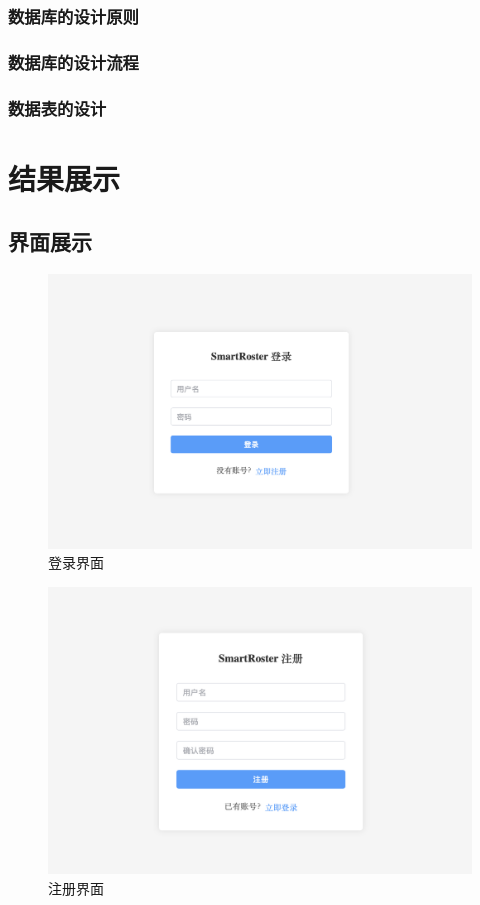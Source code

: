 \documentclass{ctexart}
\begin{document}
\subsubsection{数据库的设计原则}
\subsubsection{数据库的设计流程}
\subsubsection{数据表的设计}


\section{结果展示}
\subsection{界面展示}
\begin{figure}[H]
    \centering
    \includegraphics[width=0.8\linewidth]{./source/登录界面.png}
    \caption{登录界面}
    \label{fig:microservice-arch}
\end{figure}
\begin{figure}[H]
    \centering
    \includegraphics[width=0.8\linewidth]{./source/注册界面.png}
    \caption{注册界面}
    \label{fig:microservice-arch}
\end{figure}
\end{document}

